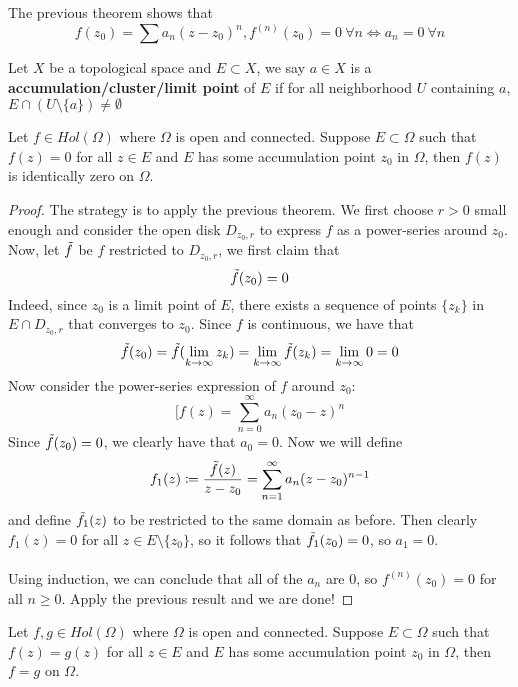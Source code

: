 \begin{remark}
The previous theorem shows that
\[f(z_0) = \sum a_n (z - z_0)^n, f^{(n)}(z_0) = 0\ \forall n \iff a_n = 0\ \forall n\]
\end{remark}

\begin{definition}
Let $X$ be a topological space and $E \subset X$, we say $a \in X$ is a \textbf{accumulation/cluster/limit point} of $E$ if for all neighborhood $U$ containing $a$, $E \cap (U \setminus \{a\}) \neq \emptyset$
\end{definition}

\begin{theorem}\label{thm::uniqueness-theorem}
Let $f \in Hol(\Omega)$ where $\Omega$ is open and connected. Suppose $E \subset \Omega$ such that $f(z) = 0$ for all $z \in E$ and $E$ has some accumulation point $z_0$ in $\Omega$, then $f(z)$ is identically zero on $\Omega$.
\end{theorem}

\begin{proof}
The strategy is to apply the previous theorem. We first choose $r > 0$ small enough and consider the open disk $D_{z_0, r}$ to express $f$ as a power-series around $z_0$. Now, let $\Tilde{f}$ be $f$ restricted to $D_{z_0, r}$, we first claim that
\[\Tilde{f}(z_0) = 0\]
Indeed, since $z_0$ is a limit point of $E$, there exists a sequence of points $\{z_k\}$ in $E \cap D_{z_0, r}$ that converges to $z_0$. Since $f$ is continuous, we have that
\[\Tilde{f}(z_0) = \Tilde{f}(\lim_{k \to \infty} z_k) = \lim_{k \to \infty} \Tilde{f}(z_k) = \lim_{k \to \infty} 0 = 0\]
Now consider the power-series expression of $f$ around $z_0$:
\[[f(z) = \sum_{n = 0}^\infty a_n (z_0 - z)^n\]
Since $\Tilde{f}(z_0) = 0$, we clearly have that $a_0 = 0$. Now we will define
\[f_1(z) \coloneqq \frac{\Tilde{f}(z)}{z - z_0} = \sum_{n = 1}^\infty a_n (z - z_0)^{n-1}\]
and define $\Tilde{f_1}(z)$ to be restricted to the same domain as before. Then clearly $f_1(z) = 0$ for all $z \in E \setminus \{z_0\}$, so it follows that $\Tilde{f_1}(z_0) = 0$, so $a_1 = 0$.\\\\
Using induction, we can conclude that all of the $a_n$ are $0$, so $f^{(n)}(z_0) = 0$ for all $n \geq 0$. Apply the previous result and we are done! 
\end{proof}

\begin{corollary}
Let $f, g \in Hol(\Omega)$ where $\Omega$ is open and connected. Suppose $E \subset \Omega$ such that $f(z) = g(z)$ for all $z \in E$ and $E$ has some accumulation point $z_0$ in $\Omega$, then $f = g$ on $\Omega$.
\end{corollary}


